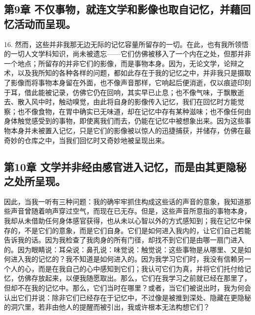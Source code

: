 
\subsection{第9章 不仅事物，就连文学和影像也取自记忆，并藉回忆活动而呈现。}

16. 然而，这些并非我那无边无际的记忆容量所留存的一切。在此，也有我所领悟的一切人文学科知识，尚未被遗忘——它们仿佛被移入了一个内在之处，但那并非一个地点；所留存的并非它们的影像，而是事物本身。因为，无论文学，论辩之术，以及我所知的各种各样的问题，都如此存在于我的记忆之中，并非我只是摄取了影像而将事物本身留在外面，也不像声音那样，它响起后便消逝，仅以痕迹印刻于耳，借此能被记录，仿佛它仍在回响，其实早已止息；也不像气味，于飘散逝去、散入风中时，触动嗅觉，由此将自身的影像传入记忆，我们在回忆时方能觉察；也不像食物，在胃中确实已无味道，却在记忆中存有某种滋味；也不像任何由身体触觉感受到的事物，即使离我们而去，仍能在记忆中被想象出来。因为这些事物本身并未被置入记忆，只是它们的影像被以惊人的迅捷捕获，并储存，仿佛在最奇妙的仓库之中，当我们回忆时又奇妙地被呈现出来。\par


\subsection{第10章 文学并非经由感官进入记忆，而是由其更隐秘之处所呈现。}

因此，当我一听有三种问题：我的确牢牢抓住构成这些话的声音的意象，我知道那些声音曾随着响声穿过空气，而现在已无存。但是，这些声音所意指的事物本身，我却从未借助任何身体感官获得，也从未以心智以外的方式感知到；我在记忆中保存的，不是它们的意象，而是它们自身。它们是如何进入我内的，让它们自己若能告诉我的话。因为我检查了我肉身的所有门径，却找不到它们是由哪一扇门进入的。因为眼睛说：耳朵说：鼻孔说：味觉说：触觉说：这些事物是从哪里、又是如何进入我的记忆的？我不知道是如何进入的。因为我学习它们时，我没有信赖另一个人的心，而是在我自己的心中感知到它们；我认可它们为真，并将它们托付给记忆，仿佛存放起来，以便我随愿取出。那么，它们在我学习之前就已经在那里了，但却不在我的记忆中。那么，它们当时在哪里？或者，当它们被说出时，我为何会认出它们并说：除非它们已经存在于记忆中，不过像是被推到深处、隐藏在更隐秘的洞穴里，若非由他人的提醒而被引出，我或许根本无法构想它们？\par

